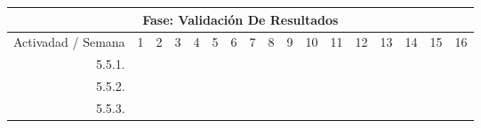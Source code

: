 \documentclass[12pt]{article}
\begin{document}
\begin{table}[H]
{\begin{tabular}{|rllllllllllllllll|}
        \multicolumn{17}{|c|}{\cellcolor[HTML]{D9D9D9}Fase: Validación De Resultados} \\ \hline
        \multicolumn{1}{|l|}{\cellcolor[HTML]{D9D9D9}Activadad / Semana} & \multicolumn{1}{c|}{\cellcolor[HTML]{B6D7A8}1} & \multicolumn{1}{c|}{\cellcolor[HTML]{B6D7A8}2} & \multicolumn{1}{c|}{\cellcolor[HTML]{B6D7A8}3} & \multicolumn{1}{c|}{\cellcolor[HTML]{B6D7A8}4} & \multicolumn{1}{c|}{\cellcolor[HTML]{A4C2F4}5} & \multicolumn{1}{c|}{\cellcolor[HTML]{A4C2F4}6} & \multicolumn{1}{c|}{\cellcolor[HTML]{A4C2F4}7} & \multicolumn{1}{c|}{\cellcolor[HTML]{A4C2F4}8} & \multicolumn{1}{c|}{\cellcolor[HTML]{B4A7D6}9} & \multicolumn{1}{c|}{\cellcolor[HTML]{B4A7D6}10} & \multicolumn{1}{c|}{\cellcolor[HTML]{B4A7D6}11} & \multicolumn{1}{c|}{\cellcolor[HTML]{B4A7D6}12} & \multicolumn{1}{c|}{\cellcolor[HTML]{EA9999}13} & \multicolumn{1}{c|}{\cellcolor[HTML]{EA9999}14} & \multicolumn{1}{c|}{\cellcolor[HTML]{EA9999}15} & \multicolumn{1}{c|}{\cellcolor[HTML]{EA9999}16} \\ \hline
        \multicolumn{1}{|r|}{5.5.1.} & \multicolumn{1}{l|}{} & \multicolumn{1}{l|}{} & \multicolumn{1}{l|}{} & \multicolumn{1}{l|}{} & \multicolumn{1}{l|}{} & \multicolumn{1}{l|}{} & \multicolumn{1}{l|}{} & \multicolumn{1}{l|}{} & \multicolumn{1}{l|}{} & \multicolumn{1}{l|}{} & \multicolumn{1}{l|}{} & \multicolumn{1}{c|}{\cellcolor[HTML]{B4A7D6}} & \multicolumn{1}{c|}{\cellcolor[HTML]{B4A7D6}} & \multicolumn{1}{l|}{} & \multicolumn{1}{l|}{} &  \\ \hline
        \multicolumn{1}{|r|}{5.5.2.} & \multicolumn{1}{l|}{} & \multicolumn{1}{l|}{} & \multicolumn{1}{l|}{} & \multicolumn{1}{l|}{} & \multicolumn{1}{l|}{} & \multicolumn{1}{l|}{} & \multicolumn{1}{l|}{} & \multicolumn{1}{l|}{} & \multicolumn{1}{l|}{} & \multicolumn{1}{l|}{} & \multicolumn{1}{l|}{} & \multicolumn{1}{l|}{} & \multicolumn{1}{c|}{\cellcolor[HTML]{B4A7D6}} & \multicolumn{1}{c|}{\cellcolor[HTML]{EA9999}} & \multicolumn{1}{c|}{\cellcolor[HTML]{EA9999}} & \multicolumn{1}{c|}{\cellcolor[HTML]{EA9999}} \\ \hline
        \multicolumn{1}{|r|}{5.5.3.} & \multicolumn{1}{l|}{} & \multicolumn{1}{l|}{} & \multicolumn{1}{l|}{} & \multicolumn{1}{l|}{} & \multicolumn{1}{l|}{} & \multicolumn{1}{l|}{} & \multicolumn{1}{l|}{} & \multicolumn{1}{l|}{} & \multicolumn{1}{l|}{} & \multicolumn{1}{l|}{} & \multicolumn{1}{l|}{} & \multicolumn{1}{l|}{} & \multicolumn{1}{c|}{\cellcolor[HTML]{B4A7D6}} & \multicolumn{1}{c|}{\cellcolor[HTML]{EA9999}} & \multicolumn{1}{c|}{\cellcolor[HTML]{EA9999}} & \multicolumn{1}{c|}{\cellcolor[HTML]{EA9999}} \\ \hline

\end{tabular}}
\end{table}
\end{document}
